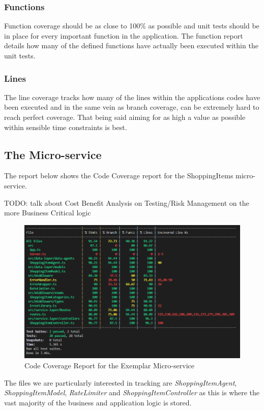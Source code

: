 \subsubsection{Functions}
Function coverage should be as close to 100\% as possible and unit tests should be in place for every important function in the application. The function report details how many of the defined functions have actually been executed within the unit tests.
\subsubsection{Lines}
The line coverage tracks how many of the lines within the applications codes have been executed and in the same vein as branch coverage, can be extremely hard to reach perfect coverage. That being said aiming for as high a value as possible within sensible time constraints is best.
\subsection{The Micro-service}
The report below shows the Code Coverage report for the ShoppingItems micro-service.

TODO: talk about Cost Benefit Analysis on Testing/Risk Management on the more Business Critical logic
\begin{figure}[!htb]
\caption{Code Coverage Report for the Exemplar Micro-service}
\centering
\includegraphics[scale=0.62]{FYP_Dissertation_template/Figures/microservice-code-coverage.PNG}
\end{figure}
\FloatBarrier
The files we are particularly interested in tracking are \textit{ShoppingItemAgent}, \textit{ShoppingItemModel}, \textit{RateLimiter} and \textit{ShoppingItemController} as this is where the vast majority of the business and application logic is stored.
